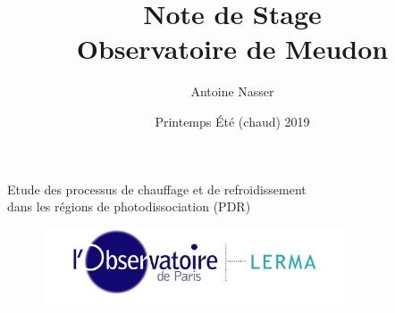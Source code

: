 \documentclass[11pt,a4paper]{article}
\title{Note de Stage\\Observatoire de Meudon}
\author{Antoine Nasser}
\date{Printemps Été (chaud) 2019}
\begin{document}
\begin{spacing}{0.98}


\maketitle
\begin{center}{\Large Etude des processus de chauffage et de refroidissement \\ dans les régions de photodissociation (PDR)}\end{center}


\setcounter{secnumdepth}{4}
\vfill
\begin{figure}[!hb]
        \centering 
        \includegraphics[trim = {0 0 0 0cm},clip,width=0.8\textwidth]{figure/LERMA2.jpg}
\end{figure}
\vfill

\tableofcontents

\setcounter{figure}{0}    

\newpage
 













\end{spacing}
\end{document}
